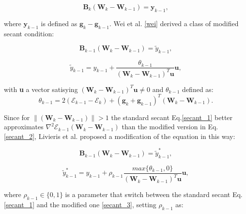 			\begin{equation}
			\label{secant_1}
 				\textbf{B}_k (\textbf{W}_k - \textbf{W}_{k-1}) = \textbf{y}_{k-1},
 			\end{equation}

 			where $\textbf{y}_{k-1}$ is defined as $\textbf{g}_k - \textbf{g}_{k-1}$.
 			Wei et al. \ref{wei} derived a class of modified secant condition:

			\begin{equation}
			\label{secant_2}
 				\textbf{B}_{k-1} (\textbf{W}_k - \textbf{W}_{k-1}) = \widetilde{y}_{k-1},
 			\end{equation}		


			\begin{equation}
			\label{secant_2}
 			 \widetilde{y}_{k-1} =  y_{k-1} + \frac{\theta_{k-1}}{(\textbf{W}_k - \textbf{W}_{k-1})^T\textbf{u}}\textbf{u},  		
 			\end{equation}	

 			with \textbf{u} a vector satisying $(\textbf{W}_k - \textbf{W}_{k-1})^T\textbf{u} \neq 0$ and $\theta_{k-1}$ defined as:
 			\begin{equation}
			\label{theta}
 			 \theta_{k-1} = 2(\mathcal{E}_{k-1} - \mathcal{E}_{k}) + (\textbf{g}_k + \textbf{g}_{k-1})^T(\textbf{W}_k - \textbf{W}_{k-1}).
 			\end{equation}	


 			Since for $\|(\textbf{W}_k - \textbf{W}_{k-1})\| > 1$ the standard secant Eq.\ref{secant_1} better approximates $\nabla^2\mathcal{E}_{k-1}(\textbf{W}_k - \textbf{W}_{k-1})$ than the modified version in Eq.\ref{secant_2}, Livieris et al. proposed a modification of the equation in this way:

 			\begin{equation}
			\label{secant_3}
 				\textbf{B}_{k-1} (\textbf{W}_k - \textbf{W}_{k-1}) = \widetilde{y}_{k-1}^*,
 			\end{equation}	

 			\begin{equation}
			\label{y_3}
 				\widetilde{y}_{k-1}^* = y_{k-1} + \rho_{k-1} \frac{max\{\theta_{k-1},0\}}{(\textbf{W}_k - \textbf{W}_{k-1})^T\textbf{u}}\textbf{u},
 			\end{equation}

 			where $\rho_{k-1} \in \{0,1\}$ is a parameter that switch between the standard secant Eq.\ref{secant_1} and the modified one \ref{secant_3}, setting $\rho_{k-1}$ as:

